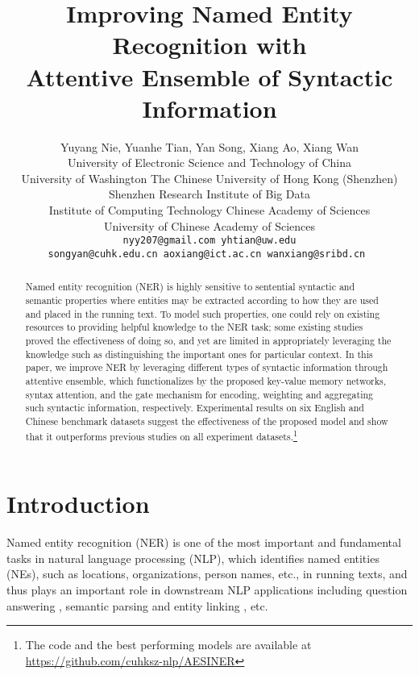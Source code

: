 \documentclass[11pt,a4paper]{article}
\title{Improving Named Entity Recognition with \\Attentive Ensemble of Syntactic Information}
\author{
    Yuyang Nie, \hspace{0.1cm}
    Yuanhe Tian, \hspace{0.1cm}
    Yan Song, \hspace{0.1cm}
    Xiang Ao, \hspace{0.1cm}
    Xiang Wan \\
University of Electronic Science and Technology of China \\
    University of Washington \hspace{0.2cm} 
    The Chinese University of Hong Kong (Shenzhen)\\
    Shenzhen Research Institute of Big Data\\
    Institute of Computing Technology Chinese Academy of Sciences\\
    University of Chinese Academy of Sciences\\
    \tt  nyy207@gmail.com yhtian@uw.edu \\
    \tt songyan@cuhk.edu.cn
    \texttt{aoxiang@ict.ac.cn}
    wanxiang@sribd.cn
}
\date{}
\begin{document}
\maketitle


\def\thefootnote{*}
\def\thefootnote{\dag}


\def\thefootnote{\arabic{footnote}}



\begin{abstract}
Named entity recognition (NER) is highly sensitive to sentential syntactic and semantic properties where entities may be extracted according to how they are used and placed in the running text.
To model such properties, one could rely on existing resources to providing helpful knowledge to the NER task; some existing studies proved the effectiveness of doing so, and yet are limited in appropriately leveraging the knowledge such as distinguishing the important ones for particular context.
In this paper,
we improve NER by leveraging different types of syntactic information through
attentive ensemble,
which functionalizes by the proposed
key-value memory networks, syntax attention, and the gate mechanism for encoding, weighting and aggregating such syntactic information, respectively.
Experimental results on six English and Chinese benchmark datasets suggest the effectiveness of the proposed model
and show that it outperforms previous studies on all experiment datasets.\footnote{The code and the best performing models are available at \url{https://github.com/cuhksz-nlp/AESINER}}
\end{abstract}

\section{Introduction}
\label{intro}






Named entity recognition (NER) is one of the most important and fundamental tasks in natural language processing (NLP), 
which identifies named entities (NEs), such as locations, organizations, person names, etc., in running texts,
and thus
plays an important role in downstream NLP applications including question answering \cite{DBLP:conf/aaai/PangLGXSC19}, semantic parsing \cite{DBLP:conf/acl/LapataD18} and entity linking \cite{DBLP:conf/acl/MartinsMM19}, etc.
\end{document}
